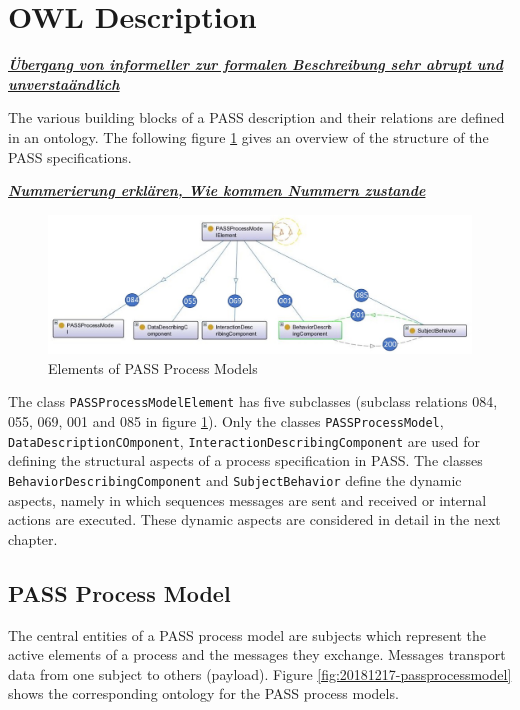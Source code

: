\section{OWL Description}
\label{OWL-DescriptionSID}

\underline{\textit{\textbf{Übergang von informeller zur formalen Beschreibung sehr abrupt und unverstaändlich}}}




The various building blocks of a PASS description and their relations are defined in an ontology. The following figure \ref{fig:20171217-passprocessmodellelement} gives an overview of the structure of the PASS specifications.  

 
 \underline{\textit{\textbf{Nummerierung erklären, Wie kommen Nummern zustande}}}


\begin{figure}[htbp]
	\centering
	\includegraphics[width=0.9\linewidth]{Figures/Ontology/SubjectInteraction/20171217-PASSProcessModellElement}
	\caption[Elements of PASS Process Models]{Elements of PASS Process Models}
	\label{fig:20171217-passprocessmodellelement}
\end{figure}

The class \texttt{PASSProcessModelElement} has five subclasses (subclass relations 084, 055, 069, 001 and 085 in figure \ref{fig:20171217-passprocessmodellelement}). Only the classes \texttt{PASSProcessModel}, \texttt{DataDescriptionCOmponent}, \texttt{InteractionDescribingComponent} are used for defining the structural aspects of a process specification in PASS. The classes \texttt{BehaviorDescribingComponent} and \texttt{SubjectBehavior} define the dynamic aspects, namely in which sequences messages are sent and received or internal actions are executed. These dynamic aspects are considered in detail in the next chapter. 

\subsection{PASS Process Model}

The central entities of a PASS process model are subjects which represent the active elements of a process and the messages they exchange. Messages transport data from one subject to others (payload). Figure \ref{fig:20181217-passprocessmodel} shows the corresponding ontology for the PASS process models.

